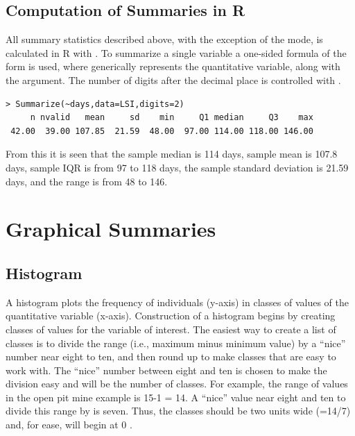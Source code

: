 \documentclass[10pt,openany]{book}\usepackage[]{graphicx}\usepackage[]{color}
\makeatletter
\newenvironment{kframe}{%
 \def\at@end@of@kframe{}%
 \ifinner\ifhmode%
  \def\at@end@of@kframe{\end{minipage}}%
  \begin{minipage}{\columnwidth}%
 \fi\fi%
 \def\FrameCommand##1{\hskip\@totalleftmargin \hskip-\fboxsep
 \colorbox{shadecolor}{##1}\hskip-\fboxsep
     \hskip-\linewidth \hskip-\@totalleftmargin \hskip\columnwidth}%
 \MakeFramed {\advance\hsize-\width
   \@totalleftmargin\z@ \linewidth\hsize
   \@setminipage}}%
 {\par\unskip\endMakeFramed%
 \at@end@of@kframe}
\newenvironment{knitrout}{}{} %
\makeatother
\begin{document}
\subsection{Computation of Summaries in R} \label{sect:DescStats}
All summary statistics described above, with the exception of the mode, is  calculated in R with . To summarize a single variable a one-sided formula of the form  is used, where  generically represents the quantitative variable, along with the  argument. The number of digits after the decimal place is controlled with .
\begin{knitrout}
\color{fgcolor}\begin{kframe}
\begin{verbatim}
> Summarize(~days,data=LSI,digits=2)
     n nvalid   mean     sd    min     Q1 median     Q3    max 
 42.00  39.00 107.85  21.59  48.00  97.00 114.00 118.00 146.00 
\end{verbatim}
\end{kframe}
\end{knitrout}

From this it is seen that the sample median is 114 days, sample mean is 107.8 days, sample IQR is from 97 to 118 days, the sample standard deviation is 21.59 days, and the range is from 48 to 146.



\newpage
\section{Graphical Summaries}
\subsection{Histogram}
A histogram plots the frequency of individuals (y-axis) in classes of values of the quantitative variable (x-axis). Construction of a histogram begins by creating classes of values for the variable of interest. The easiest way to create a list of classes is to divide the range (i.e., maximum minus minimum value) by a ``nice'' number near eight to ten, and then round up to make classes that are easy to work with. The ``nice'' number between eight and ten is chosen to make the division easy and will be the number of classes. For example, the range of values in the open pit mine example is 15-1 = 14. A ``nice'' value near eight and ten to divide this range by is seven. Thus, the classes should be two units wide (=14/7) and, for ease, will begin at 0 .
\end{document}
